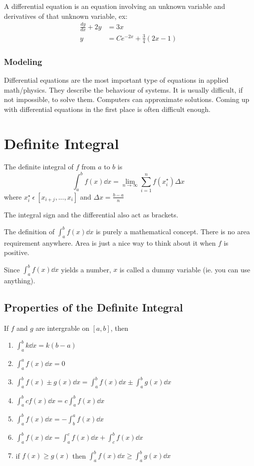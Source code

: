 \documentclass[12pt]{article}
\begin{document}
A differential equation is an equation involving an unknown variable and derivatives of that unknown variable, ex:
\begin{align*}
\frac{dy}{dx} + 2y &= 3x\\
y &= Ce^{-2x} + \frac{3}{4}(2x-1)
\end{align*}

\subsubsection*{Modeling}
Differential equations are the most important type of equations in applied math/physics. They describe the behaviour of systems. It is usually difficult, if not impossible, to solve them. Computers can approximate solutions. Coming up with differential equations in the first place is often difficult enough.

\section*{Definite Integral}
The definite integral of $f$ from $a$ to $b$ is \[ \int_a^b f(x) \dd x = \lim_{n\to\infty}\sum_{i=1}^n f(x_i^\star)\Delta x \] where $x_i^\star\ \epsilon\ [x_{i+j}, ..., x_{i}]$ and $\Delta x = \frac{b-a}{n}$

The integral sign and the differential also act as brackets.

The definition of $\int_a^b f(x) \dd x$ is purely a mathematical concept. There is no area requirement anywhere. Area is just a nice way to think about it when $f$ is positive.

Since $\int_a^b f(x) \dd x$ yields a number, $x$ is called a dummy variable (ie. you can use anything).

\subsection*{Properties of the Definite Integral}
If $f$ and $g$ are intergrable on $[a,b]$, then
\begin{enumerate}
\item $\int_a^b k \dd x = k(b-a)$
\item $\int_a^a f(x) \dd x = 0$
\item $\int_a^b f(x)\pm g(x) \dd x = \int_a^b f(x) \dd x \pm \int_a^b g(x) \dd x$
\item $\int_a^b cf(x) \dd x = c\int_a^b f(x) \dd x$
\item $\int_a^b f(x) \dd x = -\int_b^a f(x) \dd x$
\item $\int_a^b f(x) \dd x = \int_a^c f(x) \dd x + \int_c^b f(x) \dd x$
\item if $f(x) \geq g(x)$ then $\int_a^b f(x) \dd x \geq \int_a^b g(x) \dd x$
\end{enumerate}
\end{document}
